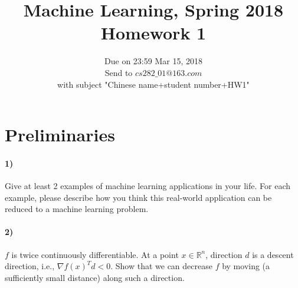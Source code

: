 \documentclass{article}
\begin{document}
\title{Machine Learning, Spring 2018\\Homework 1}
\date{Due on 23:59 Mar 15, 2018\\Send to $cs282\_01@163.com$ \\with subject "Chinese name+student number+HW1"}
\maketitle

%

\section{Preliminaries}

\paragraph{1)}Give at least 2 examples of machine learning applications in your life. For each example,
please describe how you think this real-world application can be reduced to a machine
learning problem.

\paragraph{2)} $f$ is twice continuously differentiable. At a point $x \in \mathbb{R}^n$, direction $d$ is a descent direction,
i.e., $\nabla f(x)^Td <0$. Show that we can decrease $f$ by moving (a sufficiently small distance)
along such a direction.



\end{document}
